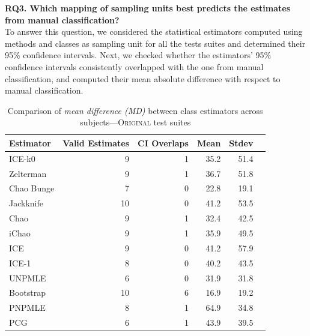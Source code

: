 \documentclass[sigconf,review,anonymous]{acmart}
\newcommand{\ICEallrare}{ICE-k0\xspace}
\newcommand{\Zelterman}{Zelterman\xspace}
\newcommand{\ChaoBunge}{Chao Bunge\xspace}
\newcommand{\Jackknife}{Jackknife\xspace}
\newcommand{\Chao}{Chao\xspace}
\newcommand{\improvedChao}{iChao\xspace}
\newcommand{\ICE}{ICE\xspace}
\newcommand{\improvedICE}{ICE-1\xspace}
\newcommand{\Unpmle}{UNPMLE\xspace}
\newcommand{\Bootstrap}{Bootstrap\xspace}
\newcommand{\Pnpmle}{PNPMLE\xspace}
\newcommand{\PCG}{PCG\xspace}
\newcommand{\Evosuite}{\textsc{EvoSuite}\xspace}
\newcommand{\original}{\textsc{Original}\xspace}
\begin{document}
\noindent\textbf{RQ3. Which mapping of sampling units best predicts the estimates
from manual classification?}\\ %
To answer this question, we considered the statistical estimators computed
using methods and classes as sampling unit for all the tests suites and
determined their 95\% confidence intervals.
%
Next, we checked whether the estimators' 95\% confidence intervals consistently
overlapped with the one from manual classification, and computed their mean absolute
difference with respect to manual classification.

\begin{table}[t]
\caption{Comparison of \emph{mean difference (MD)} between class
estimators across subjects---\original test suites}
\begin{tabular}{|l|r|r|r|r|r|}
\hline
Estimator	&Valid Estimates	&CI Overlaps	&Mean	&Stdev	\\
\hline
\ICEallrare	&	9	&	1	&35.2	&	51.4\\
\Zelterman	&	9	&	1	&36.7	&	51.8\\
\ChaoBunge	&	7	&	0	&22.8	&	19.1\\
\Jackknife	&	10	&	0	&41.2	&	53.5\\
\Chao	&	9	&	1	&32.4	&	42.5\\
\improvedChao	&	9	&	1	&35.9	&	49.5\\
\ICE	&	9	&	0	&41.2	&	57.9\\
\improvedICE	&	8	&	0	&40.2	&	43.5\\
\Unpmle	&	6	&	0	&31.9	&	31.8\\
\Bootstrap	&	10	&	6	&16.9	&	19.2\\
\Pnpmle	&	8	&	1	&64.9	&	34.8\\
\PCG	&	6	&	1	&43.9	&	39.5\\
\hline
\end{tabular}
\label{tbl:estoriginalclass}
\end{table}
\end{document}
